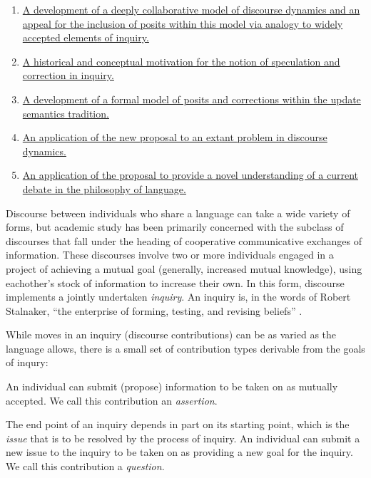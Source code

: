 \documentclass[letterpaper,]{article}
\begin{document}
\begin{enumerate}
\def\labelenumi{\arabic{enumi}.}
\item
  \hyperref[collab]{A development of a deeply collaborative model of
  discourse dynamics and an appeal for the inclusion of posits within
  this model via analogy to widely accepted elements of inquiry.}
\item
  \hyperref[hist]{A historical and conceptual motivation for the notion
  of speculation and correction in inquiry.}
\item
  \hyperref[formal]{A development of a formal model of posits and
  corrections within the update semantics tradition.}
\item
  \hyperref[contrast]{An application of the new proposal to an extant
  problem in discourse dynamics.}
\item
  \hyperref[relativism]{An application of the proposal to provide a
  novel understanding of a current debate in the philosophy of
  language.}
\end{enumerate}


Discourse between individuals who share a language can take a wide
variety of forms, but academic study has been primarily concerned with
the subclass of discourses that fall under the heading of cooperative
communicative exchanges of information. These discourses involve two or
more individuals engaged in a project of achieving a mutual goal
(generally, increased mutual knowledge), using eachother's stock of
information to increase their own. In this form, discourse implements a
jointly undertaken \emph{inquiry}. An inquiry is, in the words of Robert
Stalnaker, ``the enterprise of forming, testing, and revising beliefs''
\autocite*[ p.~ix]{stalnaker1987}.

While moves in an inquiry (discourse contributions) can be as varied as
the language allows, there is a small set of contribution types
derivable from the goals of inqury:

An individual can submit (propose) information to be taken on as
mutually accepted. We call this contribution an \emph{assertion}.

The end point of an inquiry depends in part on its starting point, which
is the \emph{issue} that is to be resolved by the process of inquiry. An
individual can submit a new issue to the inquiry to be taken on as
providing a new goal for the inquiry. We call this contribution a
\emph{question}.
\end{document}
